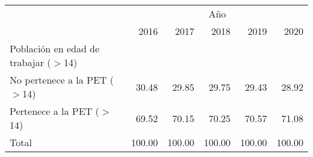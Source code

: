 \begin{tabular}{llllll}
\cline{1-6}
\multicolumn{1}{c}{} &
  \multicolumn{5}{|c}{Año} \\
\multicolumn{1}{c}{} &
  \multicolumn{1}{|r}{2016} &
  \multicolumn{1}{r}{2017} &
  \multicolumn{1}{r}{2018} &
  \multicolumn{1}{r}{2019} &
  \multicolumn{1}{r}{2020} \\
\cline{1-6}
\multicolumn{1}{l}{Población en edad de trabajar ($>$14)} &
  \multicolumn{1}{|r}{} &
  \multicolumn{1}{r}{} &
  \multicolumn{1}{r}{} &
  \multicolumn{1}{r}{} &
  \multicolumn{1}{r}{} \\
\multicolumn{1}{l}{\hspace{1em}No pertenece a la PET ($>$14)} &
  \multicolumn{1}{|r}{30.48} &
  \multicolumn{1}{r}{29.85} &
  \multicolumn{1}{r}{29.75} &
  \multicolumn{1}{r}{29.43} &
  \multicolumn{1}{r}{28.92} \\
\multicolumn{1}{l}{\hspace{1em}Pertenece a la PET ($>$14)} &
  \multicolumn{1}{|r}{69.52} &
  \multicolumn{1}{r}{70.15} &
  \multicolumn{1}{r}{70.25} &
  \multicolumn{1}{r}{70.57} &
  \multicolumn{1}{r}{71.08} \\
\multicolumn{1}{l}{\hspace{1em}Total} &
  \multicolumn{1}{|r}{100.00} &
  \multicolumn{1}{r}{100.00} &
  \multicolumn{1}{r}{100.00} &
  \multicolumn{1}{r}{100.00} &
  \multicolumn{1}{r}{100.00} \\
\cline{1-6}
\end{tabular}
